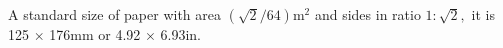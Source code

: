 A standard size of paper with area $ ( \sqrt{2} / 64 ) \mathrm{m}^2 $ and sides in ratio
$ 1 : \sqrt{2} , $ it is 125 \ensuremath{ \times } 176mm or 4.92 \ensuremath{ \times } 6.93in.